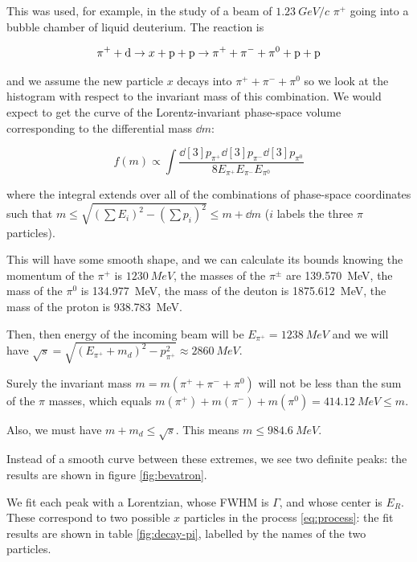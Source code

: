 \documentclass[10pt]{article}
\begin{document}
This was used, for example, in the study of a beam of \(\SI{1.23}{GeV/c} \) \(\pi^+\) going into a bubble chamber of liquid deuterium. The reaction is

\begin{equation} \label{eq:process}
    \pi ^+ + \ce{d} \rightarrow
    x + \ce{p}  + \ce{p}
    \rightarrow \pi^+ + \pi^- + \pi^0 + \ce{p} + \ce{p}
\end{equation}

and we assume the new particle \(x\) decays into \(\pi^+ + \pi^- + \pi^0 \) so we look at the histogram with respect to the invariant mass of this combination.
We would expect to get the curve of the Lorentz-invariant phase-space volume corresponding to the differential mass \(\dd{m} \):

\begin{equation}
    f(m) \propto
    \int \frac{\dd[3]{p_{\pi^+}}\dd[3]{p_{\pi^-}}\dd[3]{p_{\pi^0}}}
    {8E_{\pi^+}E_{\pi^-}E_{\pi^0}}
\end{equation}

where the integral extends over all of the combinations of phase-space coordinates such that
\(m \leq \sqrt{(\sum E_i)^2 - (\sum p_i)^2} \leq m + \dd{m}\) (\(i\) labels the three \(\pi\) particles).

This will have some smooth shape, and we can calculate its bounds knowing the momentum of the \(\pi^+\) is \(\SI{1230}{MeV}\), the masses of the \(\pi^{\pm}\) are \SI{139.570}{MeV}, the mass of the \(\pi^0\) is \SI{134.977}{MeV}, the mass of the deuton is \SI{1875.612}{MeV}, the mass of the proton is \SI{938.783}{MeV}.

Then, then energy of the incoming beam will be \(E_{\pi^+} = \SI{1238}{MeV}\) and we will have \(\sqrt{s} = \sqrt{
(E_{\pi^+} + m_d)^2 - p_{\pi^+}^2
} \approx \SI{2860}{MeV} \).

Surely the invariant mass \(m = m(\pi^+ + \pi^- + \pi^0)\) will not be less than the sum of the \(\pi\) masses, which equals \(m(\pi^+) + m(\pi^-) + m(\pi^0)=\SI{414.12}{MeV} \leq m\).

Also, we must have \(m + m_d \leq \sqrt{s} \). This means \(m \leq \SI{984.6}{MeV} \).

Instead of a smooth curve between these extremes, we see two definite peaks: the results are shown in figure \ref{fig:bevatron}.

We fit each peak with a Lorentzian, whose FWHM is \(\Gamma\), and whose center is \(E_R\). These correspond to two possible \(x\) particles in the process \eqref{eq:process}: the fit results are shown in table \ref{fig:decay-pi}, labelled by the names of the two particles.
\end{document}
